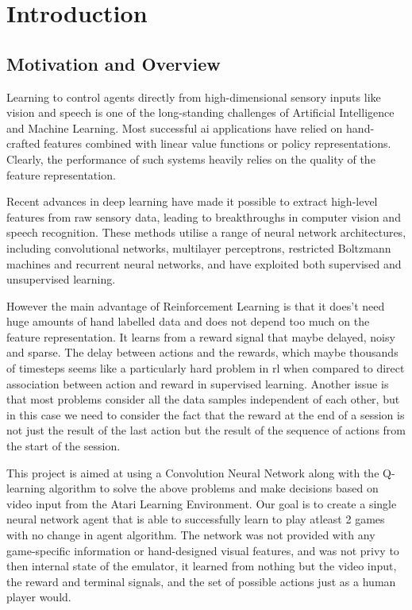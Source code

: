 \documentclass[a4paper,12pt]{report}
\begin{document}
	\newpage
	\tableofcontents
	\newpage
	\listoffigures
	\newpage
	\printacronyms[include-classes=abbrev,name=Abbreviations]

	\chapter{Introduction}
		\section{Motivation and Overview}
			Learning to control agents directly from high-dimensional sensory inputs like vision and speech is one of the long-standing challenges of Artificial Intelligence and Machine Learning. Most successful \ac{ai} applications have relied on hand-crafted features combined with linear value functions or policy representations. Clearly, the performance of such systems heavily relies on the quality of the feature representation.

			Recent advances in deep learning have made it possible to extract high-level features from raw sensory data, leading to breakthroughs in computer vision and speech recognition. These methods utilise a range of neural network architectures, including convolutional networks, multilayer perceptrons, restricted Boltzmann machines and recurrent neural networks, and have exploited both supervised and unsupervised learning.
	
			However the main advantage of Reinforcement Learning is that it does't need huge amounts of hand labelled data and does not depend too much on the feature representation. It learns from a reward signal that maybe delayed, noisy and sparse. The delay between actions and the rewards, which maybe thousands of timesteps seems like a particularly hard problem in \ac{rl} when compared to direct association between action and reward in supervised learning. Another issue is that most problems consider all the data samples independent of each other, but in this case we need to consider the fact that the reward at the end of a session is not just the result of the last action but the result of the sequence of actions from the start of the session\cite{deepmind}.

			This project is aimed at using a Convolution Neural Network along with the Q-learning algorithm to solve the above problems and make decisions based on video input from the Atari Learning Environment. Our goal is to create a single neural network agent that is able to successfully learn to play atleast 2 games with no change in agent algorithm. The network was not provided with any game-specific information or hand-designed visual features, and was not privy to then internal state of the emulator, it learned from nothing but the video input, the reward and terminal signals, and the set of possible actions just as a human player would.\\
\end{document}

